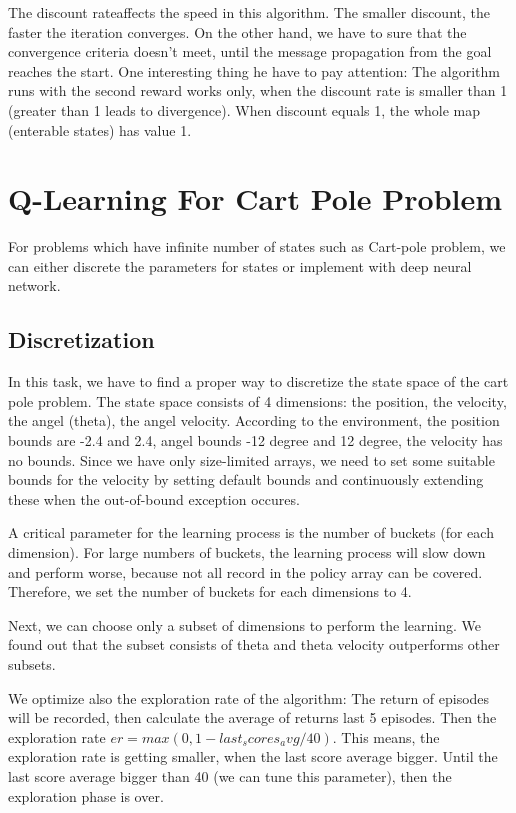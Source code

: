 \documentclass[11pt]{article}
\begin{document}
The discount rateaffects the speed in this algorithm. The smaller discount, the faster the iteration converges. On the other hand, we have to sure that the convergence criteria doesn't meet, until the message propagation from the goal reaches the start. One interesting thing he have to pay attention: The algorithm runs with the second reward works only, when the discount rate is smaller than 1 (greater than 1 leads to divergence). When discount equals 1, the whole map (enterable states) has value 1.  

\section{Q-Learning For Cart Pole Problem}

For problems which have infinite number of states such as Cart-pole problem, we can either discrete the parameters for states or implement with deep neural network.

\subsection{Discretization}

In this task, we have to find a proper way to discretize the state space of the cart pole problem. The state space consists of 4 dimensions: the position, the velocity, the angel (theta), the angel velocity. According to the environment, the position bounds are -2.4 and 2.4, angel bounds -12 degree and 12 degree, the velocity has no bounds. Since we have only size-limited arrays, we need to set some suitable bounds for the velocity by setting default bounds and continuously extending these when the out-of-bound exception occures.

A critical parameter for the learning process is the number of buckets (for each dimension). For large numbers of buckets, the learning process will slow down and perform worse, because not all record in the policy array can be covered. Therefore, we set the number of buckets for each dimensions to 4.

Next, we can choose only a subset of dimensions to perform the learning. We found out that the subset consists of theta and theta velocity outperforms other subsets.

We optimize also the exploration rate of the algorithm: The return of episodes will be recorded, then calculate the average of returns last 5 episodes. Then the exploration rate $er = max(0, 1 - last_scores_avg / 40)$.  This means, the exploration rate is getting smaller, when the last score average bigger. Until the last score average bigger than 40 (we can tune this parameter), then the exploration phase is over.
\end{document}

